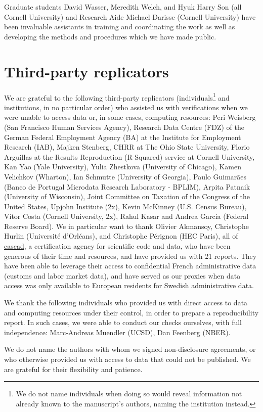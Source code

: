 \documentclass[PP]{AEA}
\begin{document}
Graduate students David Wasser, Meredith Welch, and Hyuk Harry Son (all Cornell University) and Research Aide Michael Darisse (Cornell University) have been invaluable assistants in training and coordinating the work as well as developing the methods and procedures which we have made public. 

\section{Third-party replicators}
\label{app:3rdparty}

We are grateful to the following third-party replicators (individuals\footnote{We do not name individuals when doing so would reveal information not already known to the manuscript's authors, naming the institution instead.} and institutions, in no particular order) who assisted us with verifications when we were unable to access data or, in some cases, computing resources:
%
Peri Weisberg (San Francisco Human Services Agency), Research Data Centre (FDZ) of the German Federal Employment Agency (BA) at the Institute for Employment Research (IAB), Majken Stenberg, CHRR at The Ohio State University, Florio Arguillas at the Results Reproduction (R-Squared) service at Cornell University, Kan Yao (Yale University),  Yulia Zhestkova (University of Chicago), Kamen Velichkov (Wharton), Ian Schmutte (University of Georgia), Paulo Guimarães (Banco de Portugal Microdata Research Laboratory - BPLIM), Arpita Patnaik (University of Wisconsin), Joint Committee on Taxation of the Congress of the United States, Upjohn Institute (2x), Kevin McKinney (U.S. Census Bureau), Vítor Costa (Cornell University, 2x), Rahul Kasar and Andrea Garcia (Federal Reserve Board). We in particular want to thank Olivier Akmansoy, Christophe Hurlin (Université d'Orléans), and Christophe Pérignon (HEC Paris), all of \href{https://cascad.tech}{cascad}, a certification agency for scientific code and data, who have been generous of their time and resources, and have provided us with 21 reports. They have been able to leverage their access to confidential French administrative data (customs and labor market data), and have served as our proxies when data access was only available to European residents for Swedish administrative data. 

We thank the following individuals who provided us with direct access to data and computing resources under their control, in order to prepare a reproducibility report. In such cases, we were able to conduct our checks ourselves, with full independence: Marc-Andreas Muendler (UCSD), Dan Feenberg (NBER).

We do not name the authors with whom we signed non-disclosure agreements, or who otherwise provided us with access to data that could not be published. We are grateful for their flexibility and patience.
\end{document}
